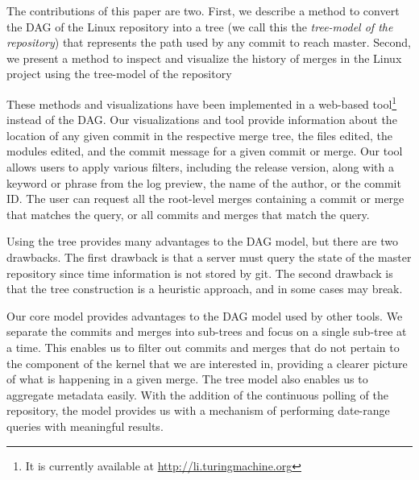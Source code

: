\documentclass[conference, draftclsnofoot, draft]{IEEEtran}
\begin{document}


 The contributions of this paper are two. First, we describe a method to convert the DAG of the Linux repository into a tree (we call this the \emph{tree-model of the
 repository}) that represents the path used by
 any commit to reach master. Second, 
 we present a method to inspect and visualize the history of merges in the  Linux project using the tree-model of the repository
 
These methods and visualizations have been implemented in a web-based
tool\footnote{It is currently available at \url{http://li.turingmachine.org}}
instead of the DAG. Our visualizations and tool provide information about the location of any given
commit in the respective merge tree, the files edited, the modules edited, and the
commit message for a given commit or merge. Our tool allows users to apply various
filters, including the release version, along with a keyword or phrase from the log
preview, the name of the author, or the commit ID. The user can request all the
root-level merges containing a commit or merge that matches the query, or all
commits and merges that match the query.




Using the tree provides many advantages to the DAG model, but there are two
drawbacks. The first drawback is that a server must query the state of the master
repository since time information is not stored by git. The second drawback is that
the tree construction is a heuristic approach, and in some cases may break.

Our core model provides advantages to the DAG model used by other tools. We separate
the commits and merges into sub-trees and focus on a single sub-tree at a time. This
enables us to filter out commits and merges that do not pertain to the component of
the kernel that we are interested in, providing a clearer picture of what is
happening in a given merge. The tree model also enables us to aggregate metadata
easily. With the addition of the continuous polling of the repository, the model
provides us with a mechanism of performing date-range queries with meaningful
results.
\end{document}

